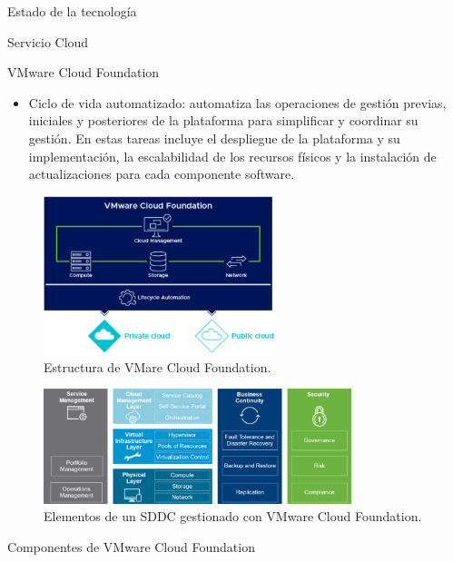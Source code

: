 \begin{chapter}{Estado de la tecnología}
\begin{section}{Servicio Cloud}
\begin{subsection}{VMware Cloud Foundation}
\begin{itemize}
        \item Ciclo de vida automatizado: automatiza las operaciones de gestión previas, iniciales y posteriores de la plataforma para simplificar y coordinar su gestión. En estas tareas incluye el despliegue de la plataforma y su implementación, la escalabilidad de los recursos físicos y la instalación de actualizaciones para cada componente software.
    
    \end{itemize}
    \begin{figure}[h!]
        \centering
        \includegraphics[width=0.6\textwidth]{imaxes/cap2recursos/overviewCF.png}
                \caption{Estructura de VMare Cloud Foundation.}
        \label{fig:Cloud-Foundation-Overview}
        \end{figure}
        \FloatBarrier
        \begin{figure}[h]
            \centering
            \includegraphics[width=0.8\textwidth]{imaxes/cap2recursos/SDDCoverview.png}
            \caption{Elementos de un SDDC gestionado con VMware Cloud Foundation.}
            \label{fig:layers-Sddc}
        \end{figure}
        \FloatBarrier
    \end{subsection}
    
    \begin{subsection}{Componentes de VMware Cloud Foundation}
    \label{subsubsect:cfcomponents}
    

\end{subsection}
\end{section}
\end{chapter}
